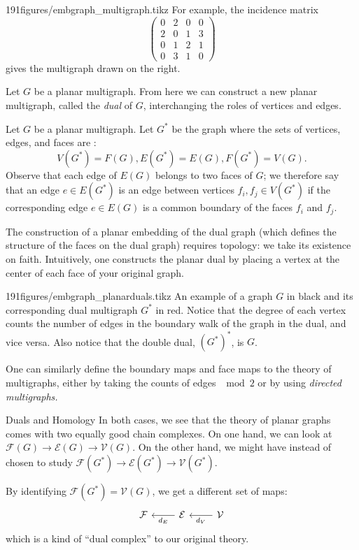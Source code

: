 \begin{examplefigureenv}[Multigraph]{191figures/embgraph_multigraph.tikz}
  For example, the incidence matrix
\[\begin{pmatrix}
0&2&0&0\\
2&0&1&3\\
0&1&2&1\\
0&3&1&0 \end{pmatrix}\]
gives the multigraph drawn on the right.
\end{examplefigureenv}
Let $G$ be a planar multigraph. From here we can construct a new planar multigraph, called the \emph{dual} of $G$, interchanging the roles of vertices and edges. 
\begin{definition}
Let $G$ be a planar multigraph. Let $G^*$ be the graph where the sets of vertices, edges, and faces are :
\[V(G^*)=F(G), E(G^*)=E(G), F(G^*)=V(G).\]
Observe that each edge of $E(G)$ belongs to two faces of $G$; we therefore say that an edge $e\in E(G^*)$ is an edge between vertices  $f_i, f_j\in V(G^*)$ if the corresponding edge $e\in E(G)$ is a common boundary of the faces $f_i$ and $f_j$.
\label{def:dualgraph}
\end{definition}
The construction of a planar embedding of the dual graph (which defines the structure of the faces on the dual graph) requires topology: we take its existence on faith. Intuitively, one constructs the planar dual by placing a vertex at the center of each face of your original graph.
\begin{examplefigureenv}{191figures/embgraph_planarduals.tikz}
  An example of a graph $G$ in black and its corresponding dual multigraph $G^*$ in red. Notice that the degree of each vertex counts the number of edges in the boundary walk of the graph in the dual, and vice versa. Also notice that the double dual, $(G^*)^*$, is $G$. 
\end{examplefigureenv}
One can similarly define the boundary maps and face maps to the theory of multigraphs, either by taking the counts of edges $\mod 2$ or by using \label{proj:dualsandhomology} \emph{directed multigraphs.} 


\begin{projectdescription}{Duals and Homology}
  In both cases, we see that the theory of planar graphs comes with two equally good chain complexes. On one hand, we can look at $\mathcal F(G)\to \mathcal E(G)\to\mathcal V(G)$. On the other hand, we might have instead of chosen to study $\mathcal F(G^*)\to \mathcal E(G^* )\to \mathcal V(G^*)$.
\end{projectdescription}
 By identifying $\mathcal F(G^*)=\mathcal V(G)$, we get a different set of maps:
\[ \begin{tikzcd}
\mathcal F& \arrow{l}{d_E} \mathcal E& \arrow{l}{d_V}  \mathcal V
\end{tikzcd}\]
which is a kind of ``dual complex'' to our original theory. 
